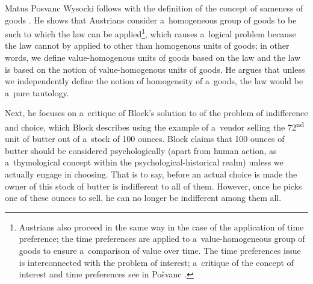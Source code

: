 \begin{artengenv}{Matus Posvanc}
Wysocki follows with the definition of the concept of sameness of goods 
\parencite[][pp.16, 20–21]{Wysocki2021problem}. %
 He shows that Austrians consider a~homogeneous group of goods to be such to which the law can be applied\footnote{Austrians also proceed in the same way in the case of the application of time preference; the time preferences are applied to a~value-homogeneous group of goods to ensure a~comparison of value over time. The time preferences issue is interconnected with the problem of interest; a~critique of the concept of interest and time preferences see in Pošvanc 
\parencite*[][]{Posvanc2019Evolutionary}.%
}, which causes a~logical problem because the law cannot by applied to other than homogenous units of goods; in other words, we define value-homogenous units of goods based on the law and the law is based on the notion of value-homogenous units of goods. He argues that unless we independently define the notion of homogeneity of a~goods, the law would be a~pure tautology.



Next, he focuses on a~critique of Block's solution to of the problem of indifference and choice, which Block 
\parencite*[][]{Block1980On} %
 describes using the example of a~vendor selling the 72\textsuperscript{nd} unit of butter out of a~stock of 100 ounces. Block 
\parencite*[][]{Block2009Rejoinder} %
 claims that 100 ounces of butter should be considered psychologically (apart from human action, as a~thymological concept within the psychological-historical realm) unless we actually engage in choosing. That is to say, before an actual choice is made the owner of this stock of butter is indifferent to all of them. However, once he picks one of these ounces to sell, he can no longer be indifferent among them all.




\end{artengenv}
